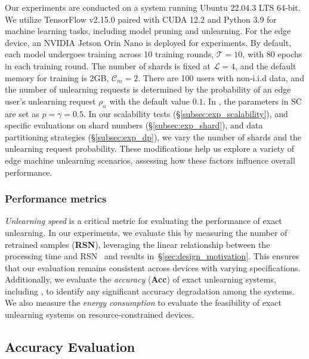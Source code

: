 \documentclass[conference,compsoc]{IEEEtran}
\begin{document}
Our experiments are conducted on a system running Ubuntu 22.04.3 LTS 64-bit. We utilize TensorFlow v2.15.0 paired with CUDA 12.2 and Python 3.9 for machine learning tasks, including model pruning and unlearning. For the edge device, an NVIDIA Jetson Orin Nano is deployed for experiments. By default, each model undergoes training across 10 training rounds, \ie $\mathcal{T}=10$, with 80 epochs in each training round. The number of shards is fixed at $\mathcal{L}=4$, and the default memory for training is 2GB, \ie $\mathcal{C}_m=2$. There are 100 users with non-i.i.d data, and the number of unlearning requests is determined by the probability of an edge user's unlearning request $\rho_{u}$ with the default value $0.1$. In \tool, the parameters in SC are set as $p=\gamma=0.5$. In our scalability tests (\S\ref{subsec:exp_scalability}), and specific evaluations on shard numbers (\S\ref{subsec:exp_shard}), and data partitioning strategies (\S\ref{subsec:exp_dp}), we vary the number of shards and the unlearning request probability. These modifications help us explore a variety of edge machine unlearning scenarios, assessing how these factors influence overall performance.

\subsubsection{Performance metrics} \textit{Unlearning speed} is a critical metric for evaluating the performance of exact unlearning. In our experiments, we evaluate this by measuring the number of retrained samples (\textbf{RSN}), leveraging the linear relationship between the processing time and RSN~\cite{bourtoule2021machine,yan2022arcane} and results in~\S\ref{sec:design_motivation}. This ensures that our evaluation remains consistent across devices with varying specifications. Additionally, we evaluate the \textit{accuracy} (\textbf{Acc}) of exact unlearning systems, including \tool, to identify any significant accuracy degradation among the systems. We also measure the \textit{energy consumption} to evaluate the feasibility of exact unlearning systems on resource-constrained devices. 

\subsection{Accuracy Evaluation}
\end{document}
